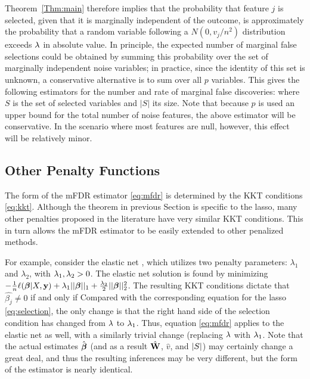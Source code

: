 Theorem~\ref{Thm:main} therefore implies that the probability that feature $j$ is selected, given that it is marginally independent of the outcome, is approximately the probability that a random variable following a $N(0, v_j/n^2)$ distribution exceeds $\lambda$ in absolute value.
In principle, the expected number of marginal false selections could be obtained by summing this probability over the set of marginally independent noise variables; in practice, since the identity of this set is unknown, a conservative alternative is to sum over all $p$ variables.
This gives the following estimators for the number and rate of marginal false discoveries:
where $S$ is the set of selected variables and $|S|$ its size.  Note that because $p$ is used an upper bound for the total number of noise features, the above estimator will be conservative.  In the scenario where most features are null, however, this effect will be relatively minor.

\subsection{Other Penalty Functions}

The form of the mFDR estimator \eqref{eq:mfdr} is determined by the KKT conditions \eqref{eq:kkt}.  Although the theorem in previous Section is specific to the lasso, many other penalties proposed in the literature have very similar KKT conditions. This in turn allows the mFDR estimator to be easily extended to other penalized methods.

For example, consider the elastic net \citep{Elastic_Net}, which utilizes two penalty parameters: $\lambda_1$ and $\lambda_2$, with $\lambda_1, \lambda_2 >0$. The elastic net solution is found by minimizing $-\frac{1}{n} \ell(\boldsymbol{\beta}|X,\mathbf{y}) + \lambda_1 ||\boldsymbol{\beta}||_1 + \frac{\lambda_2}{2}||\boldsymbol{\beta}||_{2}^2 $. The resulting KKT conditions dictate that $\hat{\beta_j} \neq 0$ if and only if
Compared with the corresponding equation for the lasso \eqref{eq:selection}, the only change is that the right hand side of the selection condition has changed from $\lambda$ to $\lambda_1$.  Thus, equation \eqref{eq:mfdr} applies to the elastic net as well, with a similarly trivial change (replacing $\lambda$ with $\lambda_1$.  Note that the actual estimates $\hat{\boldsymbol{\beta}}$ (and as a result $\hat{\mathbf{W}}$, $\hat{v}$, and $\left\lvert S\right\rvert$) may certainly change a great deal, and thus the resulting inferences may be very different, but the form of the estimator is nearly identical.

